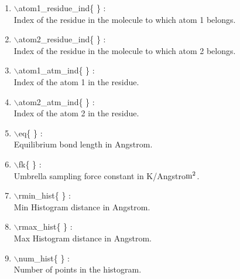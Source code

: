 \begin{itemize}
\begin{enumerate}
 \vspace{0.15in} \Large
 \item  $\backslash$atom1\_residue\_ind\{ \} : \\ 
    \large
    Index of the residue in the molecule to which atom 1 belongs.

 \vspace{0.15in} \Large
 \item  $\backslash$atom2\_residue\_ind\{ \} : \\ 
    \large
    Index of the residue in the molecule to which atom 2 belongs.

 \vspace{0.15in} \Large
 \item  $\backslash$atom1\_atm\_ind\{ \} : \\    
    \large
    Index of the atom 1 in the residue.
 
 \vspace{0.15in} \Large
 \item  $\backslash$atom2\_atm\_ind\{ \} : \\     
    \large
    Index of the atom 2 in the residue.
 
 \vspace{0.15in} \Large
 \item  $\backslash$eq\{ \} : \\               
    \large
    Equilibrium bond length in Angstrom.
  
 \vspace{0.15in} \Large
 \item  $\backslash$fk\{ \} : \\               
    \large
    Umbrella sampling force constant in K/Angstro${\rm m}^2$.

 \vspace{0.15in} \Large
 \item  $\backslash$rmin\_hist\{ \} : \\         
    \large
    Min Histogram distance in Angstrom.

 \vspace{0.15in} \Large
 \item  $\backslash$rmax\_hist\{ \} : \\         
    \large
    Max Histogram distance in Angstrom.

 \vspace{0.15in} \Large
 \item  $\backslash$num\_hist\{ \} : \\         
    \large
    Number of points in the histogram.
 

\end{enumerate}
\end{itemize}
